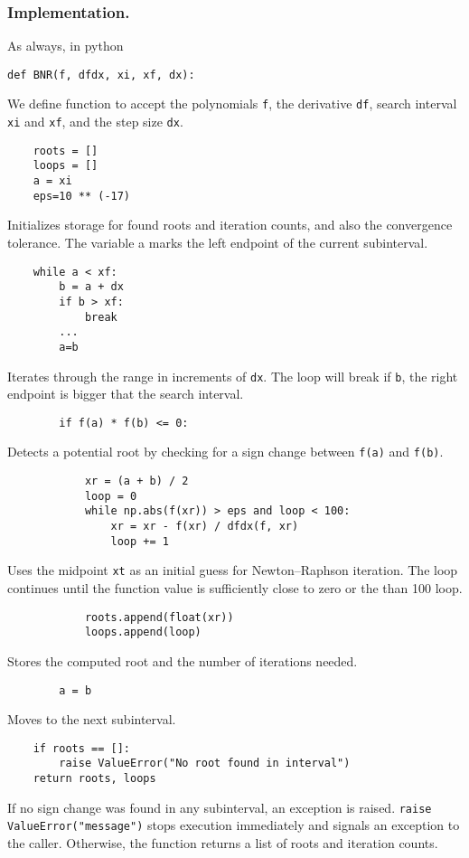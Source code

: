 \documentclass[../../../main.tex]{subfiles}
\begin{document}
\subsubsection*{Implementation.} As always, in python
\begin{verbatim}
def BNR(f, dfdx, xi, xf, dx):
\end{verbatim}
We define function to accept the polynomials \verb|f|, the derivative \verb|df|, search interval \verb|xi| and \verb|xf|, and the step size \verb|dx|.
\begin{verbatim}
    roots = []
    loops = []
    a = xi
    eps=10 ** (-17)
\end{verbatim}
Initializes storage for found roots and iteration counts, and also the convergence tolerance.
The variable a marks the left endpoint of the current subinterval.
\begin{verbatim}
    while a < xf:
        b = a + dx
        if b > xf:
            break
        ... 
        a=b
\end{verbatim}
Iterates through the range in increments of \verb|dx|.
The loop will break if \verb|b|, the right endpoint is bigger that the search interval.
\begin{verbatim}
        if f(a) * f(b) <= 0:
\end{verbatim}
Detects a potential root by checking for a sign change between \verb|f(a)| and \verb|f(b)|.
\begin{verbatim}
            xr = (a + b) / 2
            loop = 0
            while np.abs(f(xr)) > eps and loop < 100:
                xr = xr - f(xr) / dfdx(f, xr)
                loop += 1
\end{verbatim}
Uses the midpoint \verb|xt| as an initial guess for Newton–Raphson iteration.
The loop continues until the function value is sufficiently close to zero or the than 100 loop.
\begin{verbatim}
            roots.append(float(xr))
            loops.append(loop)
\end{verbatim}
Stores the computed root and the number of iterations needed.
\begin{verbatim}
        a = b
\end{verbatim}
Moves to the next subinterval.
\begin{verbatim}
    if roots == []:
        raise ValueError("No root found in interval")
    return roots, loops
\end{verbatim}
If no sign change was found in any subinterval, an exception is raised.
\verb|raise ValueError("message")| stops execution immediately and signals an exception to the caller.
Otherwise, the function returns a list of roots and iteration counts.
\end{document}
